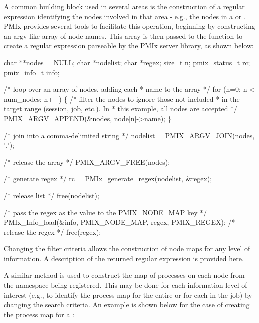 \label{cptr:api_server:noderegex}A common building block used in several areas is the construction of a regular expression identifying the nodes involved in that area - e.g., the nodes in a  or . \ac{PMIx} provides several tools to facilitate this operation, beginning by constructing an argv-like array of node names. This array is then passed to the  function to create a regular expression parseable by the \ac{PMIx} server library, as shown below:

\cspecificstart
\begin{codepar}
char **nodes = NULL;
char *nodelist;
char *regex;
size_t n;
pmix_status_t rc;
pmix_info_t info;

/* loop over an array of nodes, adding each
 * name to the array */
for (n=0; n < num_nodes; n++) \{
    /* filter the nodes to ignore those not included
     * in the target range (session, job, etc.). In
     * this example, all nodes are accepted */
    PMIX_ARGV_APPEND(&nodes, node[n]->name);
\}

/* join into a comma-delimited string */
nodelist = PMIX_ARGV_JOIN(nodes, ',');

/* release the array */
PMIX_ARGV_FREE(nodes);

/* generate regex */
rc = PMIx_generate_regex(nodelist, &regex);

/* release list */
free(nodelist);

/* pass the regex as the value to the PMIX_NODE_MAP key */
PMIx_Info_load(&info, PMIX_NODE_MAP, regex, PMIX_REGEX);
/* release the regex */
free(regex);
\end{codepar}
\cspecificend

Changing the filter criteria allows the construction of node maps for any level of information. A description of the returned regular expression is provided \hyperref[regex:fmt]{here}.

\label{cptr:api_server:ppnregex}A similar method is used to construct the map of processes on each node from the namespace being registered. This may be done for each information level of interest (e.g., to identify the process map for the entire  or for each  in the job) by changing the search criteria. An example is shown below for the case of creating the process map for a :

